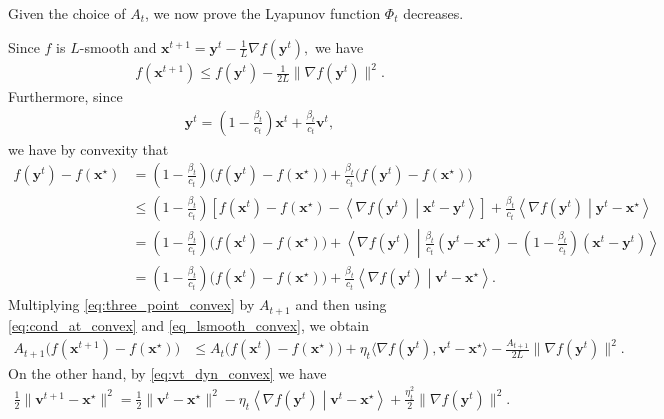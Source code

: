 \documentclass{article}
\theoremstyle{plain}
\theoremstyle{definition}
\theoremstyle{remark}
\begin{document}
Given the choice of $A_t$, we now prove the Lyapunov function $\Phi_t$ decreases.

Since \(f\) is \(L\)-smooth and
$
\mathbf{x}^{t+1}
=
\mathbf{y}^{t}-\frac1L \nabla f(\mathbf{y}^{t}),
$
we have
\begin{align}\label{eq_lsmooth_convex}
f(\mathbf{x}^{t+1})
\le
f(\mathbf{y}^{t})-\frac{1}{2L}\|\nabla f(\mathbf{y}^{t})\|^2.
\end{align}
Furthermore, since
\begin{align}
\mathbf{y}^{t}
=
\left(1-\frac{\beta_t}{c_t}\right)\mathbf{x}^{t}
+
\frac{\beta_t}{c_t}\mathbf{v}^{t},
\end{align}
we have by convexity that
\begin{align}\label{eq:three_point_convex}
f(\mathbf{y}^{t})-f(\mathbf{x}^\star)
&=
\left(1-\frac{\beta_t}{c_t}\right)
\bigl(f(\mathbf{y}^{t})-f(\mathbf{x}^\star)\bigr)
+
\frac{\beta_t}{c_t}
\bigl(f(\mathbf{y}^{t})-f(\mathbf{x}^\star)\bigr)
\nonumber\\
&\le
\left(1-\frac{\beta_t}{c_t}\right)
\left[
f(\mathbf{x}^{t})-f(\mathbf{x}^\star)
-
\left\langle
\nabla f(\mathbf{y}^{t})\middle|
\mathbf{x}^{t}-\mathbf{y}^{t}
\right\rangle
\right]
+
\frac{\beta_t}{c_t}
\left\langle
\nabla f(\mathbf{y}^{t})\middle|
\mathbf{y}^{t}-\mathbf{x}^\star
\right\rangle
\nonumber\\
&=
\left(1-\frac{\beta_t}{c_t}\right)
\bigl(f(\mathbf{x}^{t})-f(\mathbf{x}^\star)\bigr)
+
\left\langle
\nabla f(\mathbf{y}^{t})\middle|
\frac{\beta_t}{c_t}(\mathbf{y}^{t}-\mathbf{x}^\star)
-
\left(1-\frac{\beta_t}{c_t}\right)(\mathbf{x}^{t}-\mathbf{y}^{t})
\right\rangle
\nonumber\\
&=
\left(1-\frac{\beta_t}{c_t}\right)
\bigl(f(\mathbf{x}^{t})-f(\mathbf{x}^\star)\bigr)
+
\frac{\beta_t}{c_t}
\left\langle
\nabla f(\mathbf{y}^{t})\middle|
\mathbf{v}^{t}-\mathbf{x}^\star
\right\rangle .
\end{align}
Multiplying \eqref{eq:three_point_convex} by \(A_{t+1}\) and then using \eqref{eq:cond_at_convex} and \eqref{eq_lsmooth_convex},
we obtain
\begin{align}\label{eq:f_contraction_convex}
A_{t+1}\bigl(f(\mathbf{x}^{t+1})-f(\mathbf{x}^\star)\bigr)
&\le
A_t\bigl(f(\mathbf{x}^{t})-f(\mathbf{x}^\star)\bigr)
+
\eta_t\langle \nabla f(\mathbf{y}^{t}),\mathbf{v}^{t}-\mathbf{x}^\star\rangle 
-
\frac{A_{t+1}}{2L}\|\nabla f(\mathbf{y}^{t})\|^2.
\end{align}
On the other hand, by \eqref{eq:vt_dyn_convex} we have
\begin{align}\label{eq:v_dist_convex}
\frac12\|\mathbf{v}^{t+1}-\mathbf{x}^\star\|^2
=
\frac12\|\mathbf{v}^{t}-\mathbf{x}^\star\|^2
-
\eta_t\left\langle \nabla f(\mathbf{y}^{t})\middle|
\mathbf{v}^{t}-\mathbf{x}^\star\right\rangle
+
\frac{\eta_t^2}{2}\|\nabla f(\mathbf{y}^{t})\|^2.
\end{align}
\end{document}
